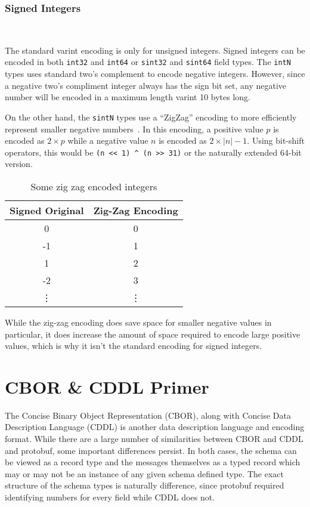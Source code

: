 \documentclass[11pt]{article}
\theoremstyle{definition}
\theoremstyle{plain}
\begin{document}
\subsubsection{Signed Integers}~\label{sec:proto-sint}

The standard varint encoding is only for unsigned integers. Signed integers can
be encoded in both \texttt{int32} and \texttt{int64} or \texttt{sint32} and
\texttt{sint64} field types. The \texttt{intN} types uses standard two's
complement to encode negative integers. However, since a negative two's
compliment integer always has the sign bit set, any negative number will be
encoded in a maximum length varint 10 bytes long.

On the other hand, the \texttt{sintN} types use a ``ZigZag'' encoding to more
efficiently represent smaller negative numbers~\cite{Encoding}. In this
encoding, a positive value $p$ is encoded as $2 \times p$ while a negative value $n$
is encoded as $2 \times |n| - 1$. Using bit-shift operators, this would be
\verb|(n << 1) ^ (n >> 31)| or the naturally extended 64-bit version.

\begin{table}[htbp]
  \centering
  \begin{tabular}{cc}
    \toprule
    Signed Original & Zig-Zag Encoding \\
    \midrule
    0 & 0 \\
    -1 & 1 \\
    1 & 2 \\
    -2 & 3 \\
    \vdots & \vdots \\
    \bottomrule
  \end{tabular}
\caption{Some zig zag encoded integers}
\label{tab:zigzag}
\end{table}

While the zig-zag encoding does save space for smaller negative values in
particular, it does increase the amount of space required to encode large
positive values, which is why it isn't the standard encoding for signed
integers. 

\section{CBOR \& CDDL Primer}

The Concise Binary Object Representation (CBOR), along with Concise Data
Description Language (CDDL) is another data description language and encoding
format. While there are a large number of similarities between CBOR and CDDL and
protobuf, some important differences persist. In both cases, the schema can be
viewed as a record type and the messages themselves as a typed record which may
or may not be an instance of any given schema defined type. The exact structure
of the schema types is naturally difference, since protobuf required identifying
numbers for every field while CDDL does not.
\end{document}
